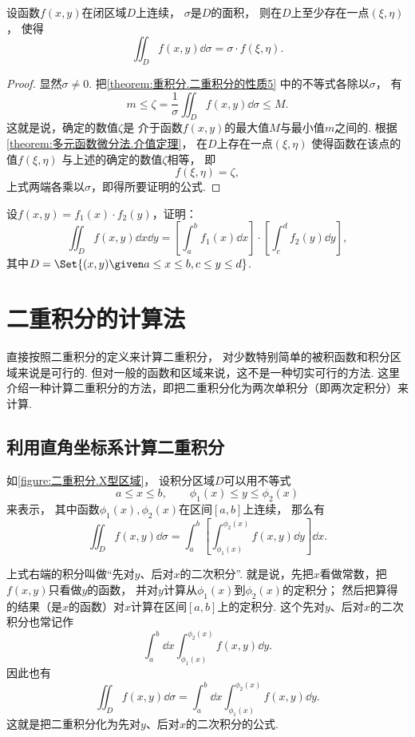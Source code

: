 \begin{property}[二重积分的中值定理]\label{theorem:重积分.二重积分的中值定理}
设函数\(f(x,y)\)在闭区域\(D\)上连续，
\(\sigma\)是\(D\)的面积，
则在\(D\)上至少存在一点\((\xi,\eta)\)，
使得\[
	\iint_D f(x,y) \dd{\sigma} = \sigma \cdot f(\xi,\eta).
\]
\begin{proof}
显然\(\sigma\neq0\).
把\cref{theorem:重积分.二重积分的性质5} 中的不等式各除以\(\sigma\)，
有\[
	m
	\leq
	\zeta = \frac{1}{\sigma} \iint_D f(x,y) \dd{\sigma}
	\leq
	M.
\]
这就是说，确定的数值\(\zeta\)是
介于函数\(f(x,y)\)的最大值\(M\)与最小值\(m\)之间的.
根据\cref{theorem:多元函数微分法.介值定理}，
在\(D\)上存在一点\((\xi,\eta)\)
使得函数在该点的值\(f(\xi,\eta)\)
与上述的确定的数值\(\zeta\)相等，
即\[
	f(\xi,\eta) = \zeta,
\]
上式两端各乘以\(\sigma\)，即得所要证明的公式.
\end{proof}
\end{property}

\begin{example}
设\(f(x,y) = f_1(x) \cdot f_2(y)\)，证明：\[
	\iint_D f(x,y) \dd{x} \dd{y}
	= \left[ \int_a^b f_1(x) \dd{x} \right] \cdot \left[ \int_c^d f_2(y) \dd{y} \right],
\]
其中\(D = \Set{(x,y) \given a \leq x \leq b, c \leq y \leq d}\).
\end{example}

\section{二重积分的计算法}
直接按照二重积分的定义来计算二重积分，
对少数特别简单的被积函数和积分区域来说是可行的.
但对一般的函数和区域来说，这不是一种切实可行的方法.
这里介绍一种计算二重积分的方法，即把二重积分化为两次单积分（即两次定积分）来计算.

\subsection{利用直角坐标系计算二重积分}
如\cref{figure:二重积分.X型区域}，
设积分区域\(D\)可以用不等式
\[
	a \leq x \leq b, \qquad
	\phi_1(x) \leq y \leq \phi_2(x)
\]来表示，
其中函数\(\phi_1(x),\phi_2(x)\)在区间\([a,b]\)上连续，
那么有\[
	\iint_D f(x,y) \dd{\sigma}
	= \int_a^b \left[ \int_{\phi_1(x)}^{\phi_2(x)} f(x,y) \dd{y} \right] \dd{x}.
\]

上式右端的积分叫做“先对\(y\)、后对\(x\)的二次积分”.
就是说，先把\(x\)看做常数，把\(f(x,y)\)只看做\(y\)的函数，
并对\(y\)计算从\(\phi_1(x)\)到\(\phi_2(x)\)的定积分；
然后把算得的结果（是\(x\)的函数）对\(x\)计算在区间\([a,b]\)上的定积分.
这个先对\(y\)、后对\(x\)的二次积分也常记作\[
	\int_a^b \dd{x} \int_{\phi_1(x)}^{\phi_2(x)} f(x,y) \dd{y}.
\]
因此也有\[
	\iint_D f(x,y) \dd{\sigma}
	= \int_a^b \dd{x} \int_{\phi_1(x)}^{\phi_2(x)} f(x,y) \dd{y}.
\]
这就是把二重积分化为先对\(y\)、后对\(x\)的二次积分的公式.

